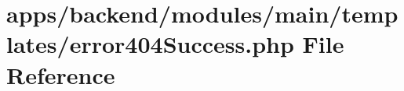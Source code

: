 \hypertarget{backend_2modules_2main_2templates_2error404_success_8php}{\section{apps/backend/modules/main/templates/error404\-Success.php File Reference}
\label{backend_2modules_2main_2templates_2error404_success_8php}
}
